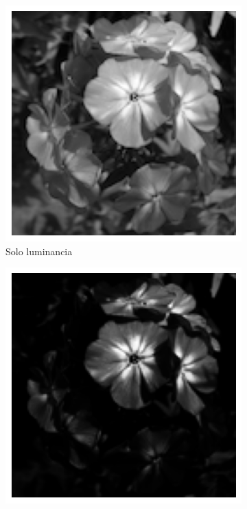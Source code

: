 \documentclass{article}
\begin{document}
\begin{figure}
\begin{subfigure}[b]{0.24\textwidth}
		\includegraphics[width= \textwidth]{imgGrau}
		\caption{Solo luminancia}
		\label{fg:imgGrau}
	\end{subfigure}
	\begin{subfigure}[b]{0.24\textwidth}
		\includegraphics[width= \textwidth]{imgGrau3p5exp}

\end{subfigure}
\end{figure}
\end{document}
